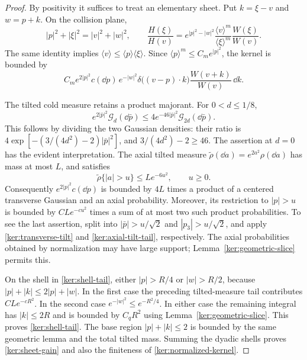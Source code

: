 \begin{proof}
By positivity it suffices to treat an elementary sheet. Put
$k=\xi-v$ and $w=p+k$. On the collision plane,
\begin{equation}\label{ker:energy-factor}
 |p|^2+|\xi|^2=|v|^2+|w|^2,
 \qquad
 \frac{H(\xi)}{H(v)}
 =e^{|p|^2-|w|^2}
    \frac{\langle v\rangle^m}{\langle\xi\rangle^m}
    \frac{W(\xi)}{W(v)}.
\end{equation}
The same identity implies
$\langle v\rangle\leq\langle p\rangle\langle\xi\rangle$.
Since $\langle p\rangle^m\leq C_m e^{|p|^2}$, the kernel is bounded
by
\begin{equation}\label{ker:tilted-kernel}
 C_m e^{2|p|^2}c(\dd p)\,
 e^{-|w|^2}\delta\bigl((v-p)\cdot k\bigr)
       \frac{W(v+k)}{W(v)}\,\dd k.
\end{equation}

The tilted cold measure retains a product majorant. For $0<d\leq1/8$,
\begin{equation}\label{ker:transverse-tilt}
 e^{2|\bar p|^2}\mathcal G_d(\dd\bar p)
 \leq4e^{-46|\bar p|^2}\mathcal G_{2d}(\dd\bar p).
\end{equation}
This follows by dividing the two Gaussian densities: their ratio is
$4\exp[-(3/(4d^2)-2)|\bar p|^2]$, and
$3/(4d^2)-2\geq46$. The assertion at $d=0$ has the evident
interpretation. The axial tilted measure
$\widetilde\rho(\dd a)=e^{2a^2}\rho(\dd a)$ has mass at most $L$,
and satisfies
\begin{equation}\label{ker:axial-tilt-tail}
 \widetilde\rho\{|a|>u\}\leq Le^{-6u^2},\qquad u\geq0.
\end{equation}
Consequently $e^{2|p|^2}c(\dd p)$ is bounded by $4L$ times a product
of a centered transverse Gaussian and an axial probability. Moreover,
its restriction to $|p|>u$ is bounded by
$CLe^{-cu^2}$ times a sum of at most two such product probabilities.
To see the last assertion, split into $|\bar p|>u/\sqrt2$ and
$|p_3|>u/\sqrt2$, and apply
\eqref{ker:transverse-tilt} and \eqref{ker:axial-tilt-tail},
respectively. The axial probabilities obtained by normalization may
have large support; Lemma~\ref{ker:geometric-slice} permits this.

On the shell in \eqref{ker:shell-tail}, either $|p|>R/4$ or
$|w|>R/2$, because $|p|+|k|\leq2|p|+|w|$. In the first case the
preceding tilted-measure tail contributes $CLe^{-cR^2}$. In the
second case $e^{-|w|^2}\leq e^{-R^2/4}$. In either case the remaining
integral has $|k|\leq2R$ and is bounded by $C_qR^2$ using
Lemma~\ref{ker:geometric-slice}. This proves
\eqref{ker:shell-tail}. The base region $|p|+|k|\leq2$ is bounded
by the same geometric lemma and the total tilted mass. Summing the
dyadic shells proves \eqref{ker:sheet-gain} and also the finiteness
of \eqref{ker:normalized-kernel}.
\end{proof}

